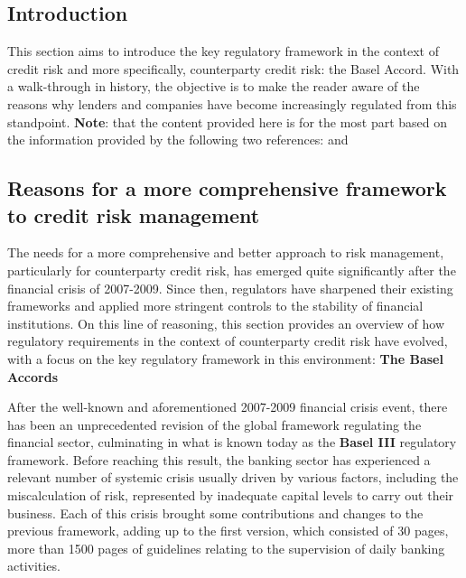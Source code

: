 \documentclass[a4paper,12pt]{article}
\begin{document}
    \subsection{Introduction}
    This section aims to introduce the key regulatory framework in the context of credit risk and more specifically, 
    counterparty credit risk: the Basel Accord. With a walk-through in history, 
    the objective is to make the reader aware of the reasons why lenders and companies have become increasingly regulated from this standpoint.
    \newline\newline
    \textbf{Note}: that the content provided here is for the most part based on the information provided by the following two references: \cite{baselhistory_fu} and \cite{baselhistory_bis}

    \subsection{Reasons for a more comprehensive framework to credit risk management}
    
    The needs for a more comprehensive and better approach to risk management, 
    particularly for counterparty credit risk, has emerged quite significantly 
    after the financial crisis of 2007-2009. Since then, regulators have sharpened 
    their existing frameworks and applied more stringent controls to 
    the stability of financial institutions. On this line of reasoning, 
    this section provides an overview of how regulatory requirements in 
    the context of counterparty credit risk have evolved, with a focus on the 
    key regulatory framework in this environment: \textbf{The Basel Accords} \cite{investopediabaselaccord}

    After the well-known and aforementioned 2007-2009 financial crisis event, 
    there has been an unprecedented revision of the global framework regulating 
    the financial sector, culminating in what is known today as the \textbf{Basel III} regulatory framework.
    Before reaching this result, the banking sector has experienced a 
    relevant number of systemic crisis usually driven by various factors, 
    including the miscalculation of risk, represented by inadequate capital levels 
    to carry out their business. Each of this crisis brought some contributions and 
    changes to the previous framework, adding up to the first version, 
    which consisted of 30 pages, more than 1500 pages of guidelines 
    relating to the supervision of daily banking activities. 
\end{document}
